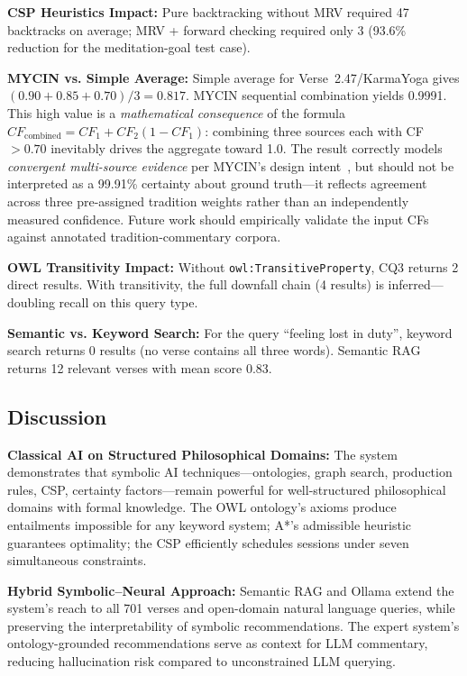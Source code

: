 \documentclass[conference]{IEEEtran}
\begin{document}
\textbf{CSP Heuristics Impact:} Pure backtracking without MRV required 47
backtracks on average; MRV + forward checking required only 3 (93.6\%
reduction for the meditation-goal test case).

\textbf{MYCIN vs. Simple Average:} Simple average for Verse~2.47/KarmaYoga
gives $(0.90 + 0.85 + 0.70)/3 = 0.817$. MYCIN sequential combination
yields 0.9991. This high value is a \textit{mathematical consequence} of
the formula $CF_\text{combined} = CF_1 + CF_2(1 - CF_1)$: combining three
sources each with CF $> 0.70$ inevitably drives the aggregate toward 1.0.
The result correctly models \textit{convergent multi-source evidence} per
MYCIN's design intent~\cite{shortliffe1976computer}, but should not be
interpreted as a 99.91\% certainty about ground truth—it reflects agreement
across three pre-assigned tradition weights rather than an independently
measured confidence. Future work should empirically validate the input CFs
against annotated tradition-commentary corpora.

\textbf{OWL Transitivity Impact:} Without \texttt{owl:TransitiveProperty},
CQ3 returns 2 direct results. With transitivity, the full downfall chain
(4 results) is inferred—doubling recall on this query type.

\textbf{Semantic vs. Keyword Search:} For the query ``feeling lost in duty'',
keyword search returns 0 results (no verse contains all three words).
Semantic RAG returns 12 relevant verses with mean score 0.83.

\subsection{Discussion}

\textbf{Classical AI on Structured Philosophical Domains:} The system
demonstrates that symbolic AI techniques—ontologies, graph search, production
rules, CSP, certainty factors—remain powerful for well-structured philosophical
domains with formal knowledge. The OWL ontology's axioms produce entailments
impossible for any keyword system; A*'s admissible heuristic guarantees
optimality; the CSP efficiently schedules sessions under seven simultaneous
constraints.

\textbf{Hybrid Symbolic--Neural Approach:} Semantic RAG and Ollama extend the
system's reach to all 701 verses and open-domain natural language queries, while
preserving the interpretability of symbolic recommendations. The expert system's
ontology-grounded recommendations serve as context for LLM commentary, reducing
hallucination risk compared to unconstrained LLM querying.
\end{document}
